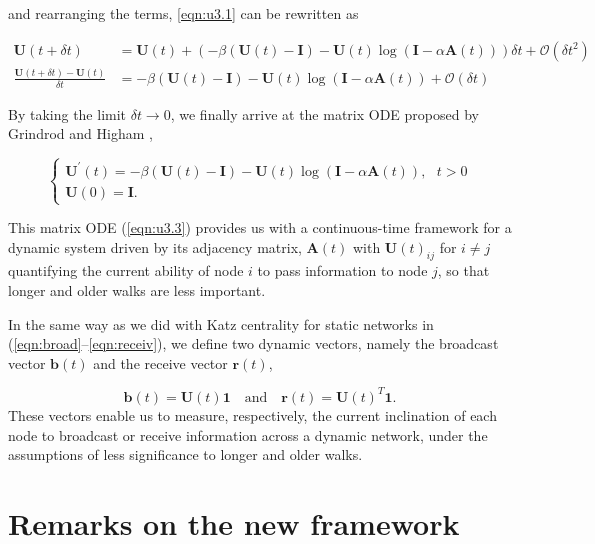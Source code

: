 and rearranging the terms, \eqref{eqn:u3.1} can be rewritten as

\begin{align*}
\mathbf{U}(t + \delta t) &= \mathbf{U}(t) + \left(-\beta (\mathbf{U}(t) - \mathbf{I}) - \mathbf{U}(t)\log(\mathbf{I}-\alpha\mathbf{A}(t))\right) \delta t + \mathcal{O}(\delta t^2) \\
\frac{\mathbf{U}(t + \delta t) - \mathbf{U}(t)}{\delta t} &= -\beta (\mathbf{U}(t) - \mathbf{I}) - \mathbf{U}(t)\log (\mathbf{I} - \alpha \mathbf{A}(t)) + \mathcal{O}(\delta t)
\end{align*}

By taking the limit $\delta t \to 0$, we finally arrive at the matrix ODE proposed by Grindrod and Higham \cite{grindrod2014dynamical}, 

\begin{equation}
\label{eqn:u3.3}
    \begin{cases}
      \mathbf{U^{\prime}}(t) = -\beta (\mathbf{U}(t) - \mathbf{I}) - \mathbf{U}(t)\log (\mathbf{I} - \alpha \mathbf{A}(t)), ~~~t>0\\
      \mathbf{U}(0)=\mathbf{I}.
    \end{cases}
\end{equation}

This matrix ODE (\ref{eqn:u3.3}) provides us with a continuous-time framework for a dynamic system driven by its adjacency matrix, $\mathbf{A}(t)$ with $\mathbf{U}(t)_{ij}$ for $i\ne j$ quantifying the current ability of node $i$ to pass information to node $j$, so that longer and older walks are less important.

In the same way as we did with Katz centrality for static networks in (\ref{eqn:broad}--\ref{eqn:receiv}), we define two dynamic vectors, namely the broadcast vector $\mathbf{b}(t)$ and the receive vector $\mathbf{r}(t)$,

\begin{equation}
\label{eqn:u3.4}
    \mathbf{b}(t) = \mathbf{U}(t)\mathbf{1} \text{~~~and~~~} \mathbf{r}(t) = \mathbf{U}(t)^T\mathbf{1}.
\end{equation}
These vectors enable us to measure, respectively, the current inclination of each node to broadcast or receive information across a dynamic network, under the assumptions of less significance to longer and older walks.


\section{Remarks on the new framework}
\label{sec:remarks}

